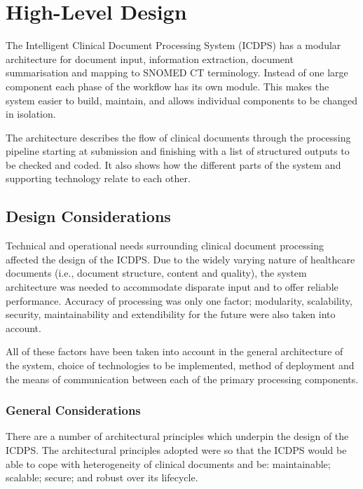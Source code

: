 \chapter{High-Level Design}

The Intelligent Clinical Document Processing System (ICDPS) has a modular architecture for document input, information extraction, document summarisation and mapping to SNOMED CT terminology. Instead of one large component each phase of the workflow has its own module. This makes the system easier to build, maintain, and allows individual components to be changed in isolation.

The architecture describes the flow of clinical documents through the processing pipeline starting at submission and finishing with a list of structured outputs to be checked and coded. It also shows how the different parts of the system and supporting technology relate to each other.

\section{Design Considerations}

Technical and operational needs surrounding clinical document processing affected the design of the ICDPS. Due to the widely varying nature of healthcare documents (i.e., document structure, content and quality), the system architecture was needed to accommodate disparate input and to offer reliable performance. Accuracy of processing was only one factor; modularity, scalability, security, maintainability and extendibility for the future were also taken into account.

All of these factors have been taken into account in the general architecture of the system, choice of technologies to be implemented, method of deployment and the means of communication between each of the primary processing components.

\subsection{General Considerations}

There are a number of architectural principles which underpin the design of the ICDPS. The architectural principles adopted were so that the ICDPS would be able to cope with heterogeneity of clinical documents and be: maintainable; scalable; secure; and robust over its lifecycle.

